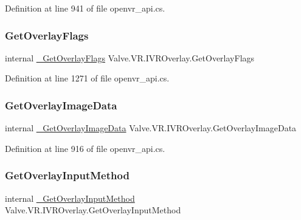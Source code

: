 Definition at line 941 of file openvr\+\_\+api.\+cs.

\mbox{\label{struct_valve_1_1_v_r_1_1_i_v_r_overlay_a4c8c715b6a590f8d3c3a7e3ccd1161a6}} 
\subsubsection{\texorpdfstring{GetOverlayFlags}{GetOverlayFlags}}
{\footnotesize\ttfamily internal \mbox{\hyperlink{struct_valve_1_1_v_r_1_1_i_v_r_overlay_a0706f71c80fe30f2327615ff966bdd66}{\+\_\+\+Get\+Overlay\+Flags}} Valve.\+V\+R.\+I\+V\+R\+Overlay.\+Get\+Overlay\+Flags}



Definition at line 1271 of file openvr\+\_\+api.\+cs.

\mbox{\label{struct_valve_1_1_v_r_1_1_i_v_r_overlay_a476c7e7a6f2fc65d37cb3be7e7901235}} 
\subsubsection{\texorpdfstring{GetOverlayImageData}{GetOverlayImageData}}
{\footnotesize\ttfamily internal \mbox{\hyperlink{struct_valve_1_1_v_r_1_1_i_v_r_overlay_a871e10fd2136e1cfe17cab1e20aa3832}{\+\_\+\+Get\+Overlay\+Image\+Data}} Valve.\+V\+R.\+I\+V\+R\+Overlay.\+Get\+Overlay\+Image\+Data}



Definition at line 916 of file openvr\+\_\+api.\+cs.

\mbox{\label{struct_valve_1_1_v_r_1_1_i_v_r_overlay_aef3015811e68ebf12748318efe02a563}} 
\subsubsection{\texorpdfstring{GetOverlayInputMethod}{GetOverlayInputMethod}}
{\footnotesize\ttfamily internal \mbox{\hyperlink{struct_valve_1_1_v_r_1_1_i_v_r_overlay_a0144a0a15ffc7d02c585198bc2cdcc7c}{\+\_\+\+Get\+Overlay\+Input\+Method}} Valve.\+V\+R.\+I\+V\+R\+Overlay.\+Get\+Overlay\+Input\+Method}



